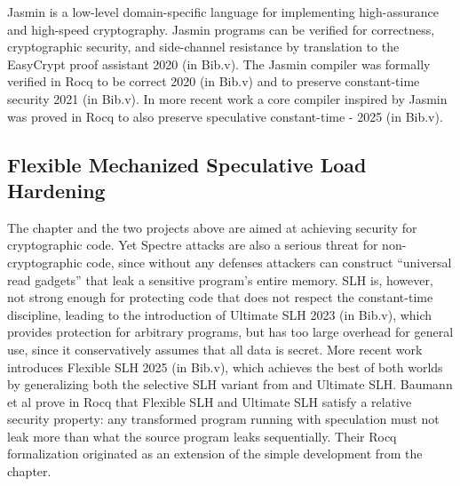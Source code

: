 \documentclass[12pt]{report}
\begin{document}
 Jasmin is a low-level domain-specific language for implementing
    high-assurance and high-speed cryptography. Jasmin programs can be verified
    for correctness, cryptographic security, and side-channel resistance by
    translation to the EasyCrypt proof assistant    2020 (in Bib.v).
    The Jasmin compiler was formally verified in Rocq to be correct
       2020 (in Bib.v) and to preserve constant-time security
       2021 (in Bib.v). In more recent work a core compiler inspired by
    Jasmin was proved in Rocq to also preserve speculative constant-time
    -   2025 (in Bib.v). 
\begin{coqdoccode}
\coqdocemptyline
\end{coqdoccode}
\subsection{Flexible Mechanized Speculative Load Hardening}



 The  chapter and the two projects above are
    aimed at achieving security for cryptographic code. Yet Spectre attacks
    are also a serious threat for non-cryptographic code, since without any
    defenses attackers can construct ``universal read gadgets'' that leak a
    sensitive program's entire memory. SLH is, however, not strong enough for
    protecting code that does not respect the constant-time discipline, leading
    to the introduction of Ultimate SLH    2023 (in Bib.v), which provides
    protection for arbitrary programs, but has too large overhead for general
    use, since it conservatively assumes that all data is secret. More recent
    work introduces Flexible SLH    2025 (in Bib.v), which achieves the
    best of both worlds by generalizing both the selective SLH variant from
     and Ultimate SLH. Baumann et al prove in Rocq that Flexible
    SLH and Ultimate SLH satisfy a relative security property: any
    transformed program running with speculation must not leak more than what
    the source program leaks sequentially. Their Rocq formalization originated
    as an extension of the simple development from the  chapter. 
\begin{coqdoccode}
\coqdocemptyline
\end{coqdoccode}
\end{document}
